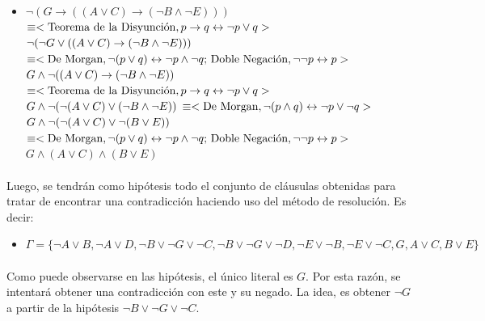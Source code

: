 \documentclass{article}
\begin{document}
\begin{itemize}
\begin{itemize}
\begin{itemize}
		\item $\neg( G \rightarrow ((A \lor C) \rightarrow (\neg B \land \neg E)))$ \\
				$\equiv < \text{Teorema de la Disyunci\'on},  
					p \rightarrow q \leftrightarrow \neg p \lor q > \\$
				$ \neg(\neg G \lor ((A \lor C) \rightarrow (\neg B \land \neg E)))\\$
				$ \equiv <\text{De Morgan}, 
					\neg(p \lor q) \leftrightarrow \neg p \land \neg q \text {; Doble Negaci\'on}, \neg \neg p \leftrightarrow p> \\ $
				$ G \land \neg((A \lor C) \rightarrow (\neg B \land \neg E))\\$
				$\equiv < \text{Teorema de la Disyunci\'on},  
					p \rightarrow q \leftrightarrow \neg p \lor q > \\$
				$ G \land \neg(\neg(A \lor C) \lor (\neg B \land \neg E))\\$
				$\equiv <\text{De Morgan}, 
					\neg(p \land q) \leftrightarrow \neg p \lor \neg q> \\$
				$ G \land \neg(\neg(A \lor C) \lor \neg(B \lor E))\\$
				$ \equiv <\text{De Morgan}, 
					\neg(p \lor q) \leftrightarrow \neg p \land \neg q \text {; Doble Negaci\'on}, \neg \neg p \leftrightarrow p> \\ $
				$ G \land (A \lor C) \land (B \lor E)$

		\end{itemize}				 
		
		\paragraph{}
		Luego, se tendr\'an como hip\'otesis todo el conjunto de cl\'ausulas obtenidas para tratar de encontrar una contradicci\'on haciendo uso del m\'etodo de resoluci\'on. Es decir:
		
		\begin{itemize}
		\item $\Gamma = \{\neg A \lor B,\neg A \lor D,\neg B \lor \neg G \lor \neg C ,\neg B \lor \neg G \lor \neg D,\neg E \lor \neg B, \neg E \lor \neg C, G, A \lor C, B \lor E\} $
		\end{itemize}
		
		\paragraph{}
		Como puede observarse en las hip\'otesis, el \'unico literal es $G$. Por esta raz\'on, se intentar\'a obtener una contradicci\'on con este y su negado. La idea, es obtener $\neg G$ a partir de la hip\'otesis $\neg B \lor \neg G \lor \neg C$. 
		

\end{itemize}
\end{itemize}
\end{document}
